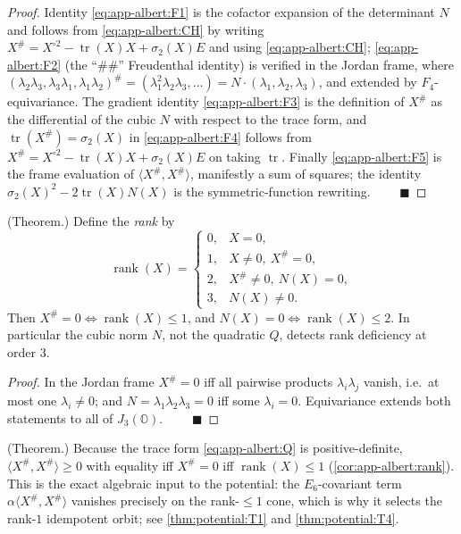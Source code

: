 \begin{proof}
Identity \eqref{eq:app-albert:F1} is the cofactor expansion of the determinant
$N$ and follows from \eqref{eq:app-albert:CH} by writing
$X^\#=X^{\circ2}-\operatorname{tr}(X)X+\sigma_2(X)E$ and using
\eqref{eq:app-albert:CH}; \eqref{eq:app-albert:F2} (the ``$\#\#$'' Freudenthal
identity) is verified in the Jordan frame, where
$(\lambda_2\lambda_3,\lambda_3\lambda_1,\lambda_1\lambda_2)^\#
=(\lambda_1^2\lambda_2\lambda_3,\dots)=N\cdot(\lambda_1,\lambda_2,\lambda_3)$, and
extended by $F_4$-equivariance. The gradient identity \eqref{eq:app-albert:F3} is
the definition of $X^\#$ as the differential of the cubic $N$ with respect to the
trace form, and $\operatorname{tr}(X^\#)=\sigma_2(X)$ in
\eqref{eq:app-albert:F4} follows from
$X^\#=X^{\circ2}-\operatorname{tr}(X)X+\sigma_2(X)E$ on taking $\operatorname{tr}$.
Finally \eqref{eq:app-albert:F5} is the frame evaluation of
$\langle X^\#,X^\#\rangle$, manifestly a sum of squares; the identity
$\sigma_2(X)^2-2\operatorname{tr}(X)N(X)$ is the symmetric-function rewriting.
$\qquad\blacksquare$
\end{proof}

\begin{corollary}\label{cor:app-albert:rank}
\textup{(Theorem.)}
Define the \emph{rank} by
\begin{equation}\label{eq:app-albert:rank}
  \operatorname{rank}(X)=
  \begin{cases}
    0,& X=0,\\
    1,& X\neq 0,\ X^\#=0,\\
    2,& X^\#\neq0,\ N(X)=0,\\
    3,& N(X)\neq0.
  \end{cases}
\end{equation}
Then $X^\#=0\iff\operatorname{rank}(X)\le1$, and $N(X)=0\iff\operatorname{rank}(X)
\le2$. In particular the cubic norm $N$, not the quadratic $Q$, detects rank
deficiency at order $3$.
\end{corollary}

\begin{proof}
In the Jordan frame $X^\#=0$ iff all pairwise products $\lambda_i\lambda_j$
vanish, i.e.\ at most one $\lambda_i\neq0$; and $N=\lambda_1\lambda_2\lambda_3=0$
iff some $\lambda_i=0$. Equivariance extends both statements to all of
$J_3(\mathbb O)$. $\qquad\blacksquare$
\end{proof}

\begin{remark}\label{rmk:app-albert:positivity}
\textup{(Theorem.)}
Because the trace form \eqref{eq:app-albert:Q} is positive-definite,
$\langle X^\#,X^\#\rangle\ge0$ with equality iff $X^\#=0$ iff
$\operatorname{rank}(X)\le1$ (\autoref{cor:app-albert:rank}). This is the exact
algebraic input to the potential: the $E_6$-covariant term
$\alpha\langle X^\#,X^\#\rangle$ vanishes precisely on the rank-$\le1$ cone, which
is why it selects the rank-$1$ idempotent orbit; see
\autoref{thm:potential:T1} and \autoref{thm:potential:T4}.
\end{remark}

